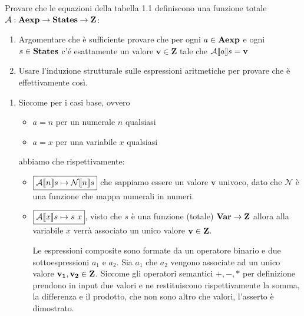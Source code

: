 {Provare che le equazioni della tabella 1.1 definiscono una funzione totale $\mathcal{A}:\mbox{\textbf{Aexp}} \rightarrow \mbox{\textbf{States}} \rightarrow \mbox{\textbf{Z}}$: 
	\begin{enumerate}
		\item Argomentare che è sufficiente provare che per ogni $a \in \mbox{\textbf{Aexp}}$ e ogni $s \in \mbox{\textbf{States}}$
		c'é esattamente un valore $\mathbf{v} \in \mathbf{Z}$ tale che $\mathcal{A} \llbracket a \rrbracket s = \mathbf{v}$
		\item Usare l'induzione strutturale sulle espressioni aritmetiche per provare che è effettivamente
		così.
	\end{enumerate}
}
{
	\begin{enumerate}
		\item Siccome per i casi base, ovvero
		\begin{itemize}
			\item $\boxed{a = n}$ per un numerale $n$ qualsiasi
			\item $\boxed{a = x}$ per una variabile $x$ qualsiasi
		\end{itemize} 
		abbiamo che rispettivamente:
		\begin{itemize}
			\item $\boxed{\mathcal{A} \llbracket n \rrbracket s \mapsto \mathcal{N} \llbracket n \rrbracket s}$ che sappiamo essere un valore $\mathbf{v}$ univoco, dato che $\mathcal{N}$ è una funzione che mappa numerali in numeri.
			\item $\boxed{\mathcal{A} \llbracket x \rrbracket s \mapsto s\mbox{ } x}$, visto che $s$ è una funzione (totale) $\mbox{\textbf{Var}} \rightarrow \mbox{\textbf{Z}}$  allora
			alla variabile $x$ verrà associato un unico valore $\mathbf{v} \in \mbox{\textbf{Z}}$.
			
			Le espressioni composite sono formate da un operatore binario e due sottoespressioni
			$a_1$ e $a_2$.
			Sia $a_1$ che $a_2$ vengono associate ad un unico valore $\mathbf{v_1}, \mathbf{v_2} \in \mbox{\textbf{Z}}$.
			Siccome gli operatori semantici $+, -, *$ per definizione prendono in input due
			valori e ne restituiscono rispettivamente la somma, la differenza e il prodotto, che
			non sono altro che valori, l'asserto è dimostrato.
		

\end{itemize}
\end{enumerate}}
